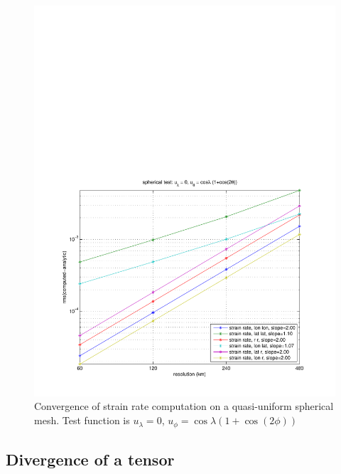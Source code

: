 \documentclass[11pt]{report}
\begin{document}
\begin{figure}[htbp]
 \center
 \includegraphics[scale=0.8, trim = 0 0 0 4in, clip]{f/a19_sph_conv_test_2.pdf}
 \caption{Convergence of strain rate computation on a quasi-uniform spherical mesh.  Test function is $u_{\lambda}=0$, $u_{\phi}=\cos \lambda (1+\cos(2\phi))$}
 \label{fig:convergence2}
\end{figure}


\subsection{Divergence of a tensor}
\end{document}
